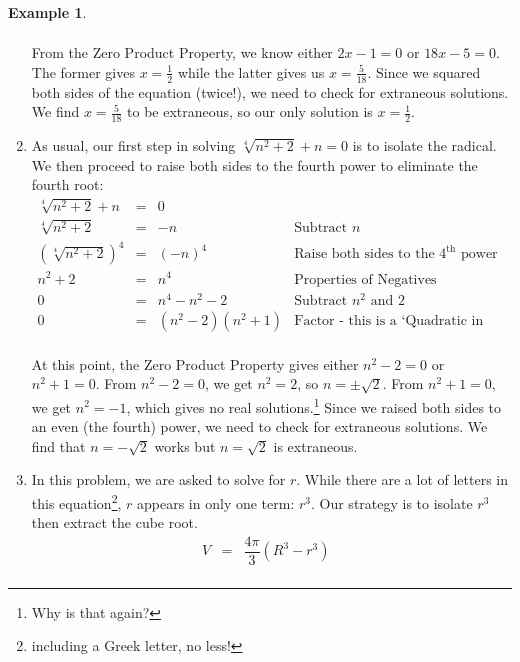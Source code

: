 \documentclass[11pt]{article}
\theoremstyle{definition}  %
\newtheorem{ex}{\bf Example}
\begin{document}
\begin{ex}
\begin{enumerate}
\[\begin{array}{rclr}
\end{array} \] From the Zero Product Property, we know either $2x-1 = 0$ or $18x - 5 = 0$.  The former gives $x = \frac{1}{2}$ while the latter gives us $x = \frac{5}{18}$.  Since we squared both sides of the equation (twice!), we need to check for extraneous solutions.  We find $x = \frac{5}{18}$ to be extraneous, so our only solution is $x = \frac{1}{2}$.

\item As usual, our first step in solving $\sqrt[4]{n^2 + 2} + n = 0$ is to isolate the radical.  We then proceed to raise both sides to the fourth power to eliminate the fourth root:\[ \begin{array}{rclr}

\sqrt[4]{n^2 + 2} + n & = & 0 &  \\

\sqrt[4]{n^2 + 2} & = &  -n & \text{Subtract $n$} \\

(\sqrt[4]{n^2 + 2})^4 & = & (-n)^4 & \text{Raise both sides to the $4^{\text{th}}$ power} \\

n^2 + 2 & = & n^4 & \text{Properties of Negatives}\\

0 & = & n^{4} - n^2 - 2 & \text{Subtract $n^2$ and $2$} \\

0 & = & (n^2 - 2)(n^2 + 1) & \text{Factor - this is a `Quadratic in Disguise'} \\

\end{array} \]

At this point, the Zero Product Property gives either $n^2 - 2 = 0$ or $n^2 + 1 = 0$.  From $n^2 - 2 = 0$, we get $n^2 = 2$, so $n = \pm \sqrt{2}$.  From $n^2 + 1 = 0$, we get $n^2 = -1$, which gives no real solutions.\footnote{Why is that again?}  Since we raised both sides to an even (the fourth) power, we need to check for extraneous solutions. We find that $n = -\sqrt{2}$ works but $n = \sqrt{2}$ is extraneous.

\item In this problem, we are asked to solve for $r$. While there are a lot of letters in this equation\footnote{including a Greek letter, no less!}, $r$ appears in only one term:  $r^3$.  Our strategy is to isolate $r^3$ then extract the cube root.\[ \begin{array}{rclr}

V & = & \dfrac{4\pi}{3}(R^3 - r^3) & \\ [5pt]


\end{array}\]
\end{enumerate}
\end{ex}
\end{document}
